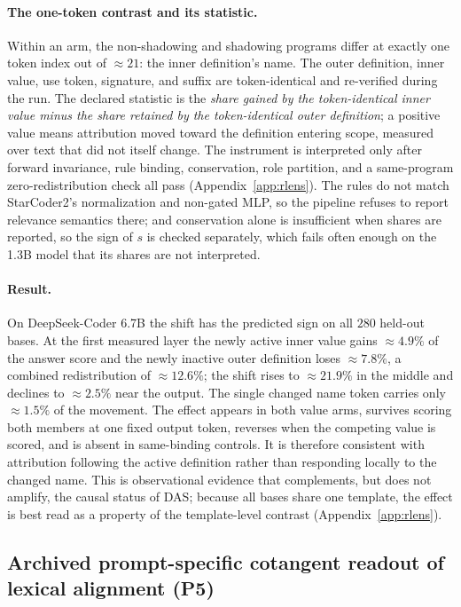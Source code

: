 \documentclass[10pt]{article}
\begin{document}
\paragraph{The one-token contrast and its statistic.} Within an arm, the
non-shadowing and shadowing programs differ at exactly one token index out of
$\approx 21$: the inner definition's name. The outer definition, inner value, use
token, signature, and suffix are token-identical and re-verified during the run.
The declared statistic is the \emph{share gained by the token-identical inner
value minus the share retained by the token-identical outer definition}; a
positive value means attribution moved toward the definition entering scope,
measured over text that did not itself change. The instrument is interpreted only
after forward invariance, rule binding, conservation, role partition, and a
same-program zero-redistribution check all pass (Appendix~\ref{app:rlens}). The
rules do not match StarCoder2's normalization and non-gated MLP, so the pipeline
refuses to report relevance semantics there; and conservation alone is insufficient
when shares are reported, so the sign of $s$ is checked separately, which fails
often enough on the 1.3B model that its shares are not interpreted.

\paragraph{Result.} On DeepSeek-Coder 6.7B the shift has the predicted sign on all
$280$ held-out bases. At the first measured layer the newly active inner value
gains $\approx 4.9\%$ of the answer score and the newly inactive outer definition
loses $\approx 7.8\%$, a combined redistribution of $\approx 12.6\%$; the shift
rises to $\approx 21.9\%$ in the middle and declines to $\approx 2.5\%$ near the
output. The single changed name token carries only $\approx 1.5\%$ of the
movement. The effect appears in both value arms, survives scoring both members at
one fixed output token, reverses when the competing value is scored, and is
absent in same-binding controls. It is therefore consistent with attribution
following the active definition rather than responding locally to the changed
name. This is observational evidence that complements, but does not amplify, the
causal status of DAS; because all bases share one template, the effect is best
read as a property of the template-level contrast (Appendix~\ref{app:rlens}).

\subsection{Archived prompt-specific cotangent readout of lexical alignment (P5)}
\label{sec:jlens}
\end{document}
